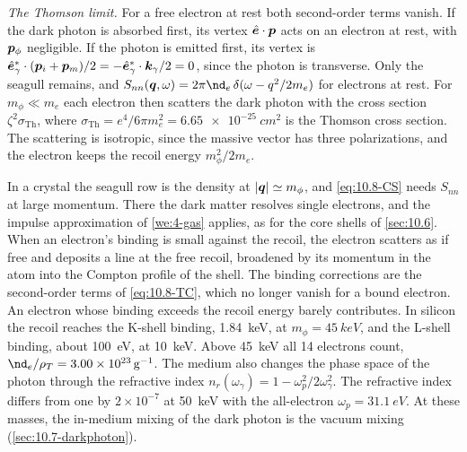 \emph{The Thomson limit.} For a free electron at rest both second-order terms vanish. If the dark photon is absorbed first, its vertex $\hat{\bm{e}}\cdot\bm{p}$ acts on an electron at rest, with $\bm{p}_\phi$ negligible. If the photon is emitted first, its vertex is $\hat{\bm{e}}_\gamma^*\cdot(\bm{p}_i + \bm{p}_m)/2 = -\hat{\bm{e}}_\gamma^*\cdot\bm{k}_\gamma/2 = 0$, since the photon is transverse. Only the seagull remains, and $S_{nn}(\vect{q},\omega) = 2\pi\nd_e\,\delta(\omega - q^2/2m_e)$ for electrons at rest. For $m_\phi \ll m_e$ each electron then scatters the dark photon with the cross section $\zeta^2\sigma_{\mathrm{Th}}$, where $\sigma_{\mathrm{Th}} = e^4/6\pi m_e^2 = \SI{6.65e-25}{cm^2}$ is the Thomson cross section. The scattering is isotropic, since the massive vector has three polarizations, and the electron keeps the recoil energy $m_\phi^2/2m_e$.

In a crystal the seagull row is the density at $|\bm{q}| \simeq m_\phi$, and \cref{eq:10.8-CS} needs $S_{nn}$ at large momentum. There the dark matter resolves single electrons, and the impulse approximation of \cref{we:4-gas} applies, as for the core shells of \cref{sec:10.6}. When an electron's binding is small against the recoil, the electron scatters as if free and deposits a line at the free recoil, broadened by its momentum in the atom into the Compton profile of the shell. The binding corrections are the second-order terms of \cref{eq:10.8-TC}, which no longer vanish for a bound electron. An electron whose binding exceeds the recoil energy barely contributes. In silicon the recoil reaches the K-shell binding, \SI{1.84}{keV}, at $m_\phi = \SI{45}{keV}$, and the L-shell binding, about \SI{100}{eV}, at \SI{10}{keV}. Above \SI{45}{keV} all 14 electrons count, $\nd_e/\rho_T = 3.00\times10^{23}\,\mathrm{g}^{-1}$. The medium also changes the phase space of the photon through the refractive index $n_r(\omega_\gamma) = 1 - \omega_p^2/2\omega_\gamma^2$. The refractive index differs from one by $2\times10^{-7}$ at \SI{50}{keV} with the all-electron $\omega_p = \SI{31.1}{eV}$. At these masses, the in-medium mixing of the dark photon is the vacuum mixing (\cref{sec:10.7-darkphoton}).

